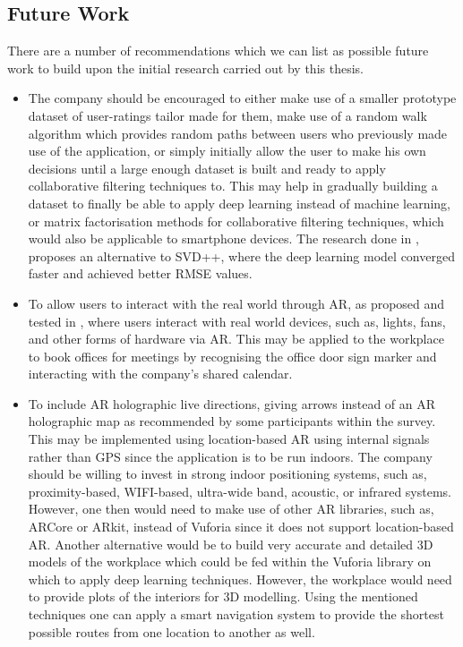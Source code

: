 \documentclass{aifyp}
\begin{document}
\subsection{Future Work}
\indent There are a number of recommendations which we can list as possible future work to build upon the initial research carried out by this thesis.
\begin{itemize}
    \item The company should be encouraged to either make use of a smaller prototype dataset of user-ratings tailor made for them, make use of a random walk algorithm which provides random paths between users who previously made use of the application, or simply initially allow the user to make his own decisions until a large enough dataset is built and ready to apply collaborative filtering techniques to. This may help in gradually building a dataset to finally be able to apply deep learning instead of machine learning, or matrix factorisation methods for collaborative filtering techniques, which would also be applicable to smartphone devices. The research done in  \cite{DeepLearningRecommendation}, proposes an alternative to SVD++, where the deep learning model converged faster and achieved better RMSE values.
    
    \item To allow users to interact with the real world through AR, as proposed and tested in \cite{SmartDeviceAR}, where users interact with real world devices, such as, lights, fans, and other forms of hardware via AR. This may be applied to the workplace to book offices for meetings by recognising the office door sign marker and interacting with the company’s shared calendar.
    
    \item To include AR holographic live directions, giving arrows instead of an AR holographic map as recommended by some participants within the survey. This may be implemented using location-based AR using internal signals rather than GPS since the application is to be run indoors. The company should be willing to invest in strong indoor positioning systems, such as, proximity-based, WIFI-based, ultra-wide band, acoustic, or infrared systems. However, one then would need to make use of other AR libraries, such as, ARCore or ARkit, instead of Vuforia since it does not support location-based AR. Another alternative would be to build very accurate and detailed 3D models of the workplace which could be fed within the Vuforia library on which to apply deep learning techniques. However, the workplace would need to provide plots of the interiors for 3D modelling. Using the mentioned techniques one can apply a smart navigation system to provide the shortest possible routes from one location to another as well.
    

\end{itemize}
\end{document}
